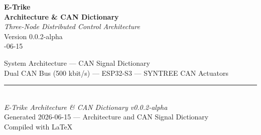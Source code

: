 \documentclass[12pt,a4paper,oneside]{report}
\begin{document}

\thispagestyle{empty}

\vspace*{60mm}

\begin{center}
  {\fontsize{28}{34}\selectfont\textbf{E-Trike}}\\[8mm]
  {\fontsize{22}{28}\selectfont\textbf{Architecture \& CAN Dictionary}}\\[20mm]
  {\fontsize{14}{18}\selectfont\textit{Three-Node Distributed Control Architecture}}\\[30mm]
  {\fontsize{12}{15}\selectfont Version 0.0.2-alpha}\\[4mm]
  {\fontsize{11}{14}-06-15}
\end{center}

\vfill

\begin{center}
  {\footnotesize
  System Architecture --- CAN Signal Dictionary\\[2mm]
  Dual CAN Bus (500 kbit/s) --- ESP32-S3 --- SYNTREE CAN Actuators
  }
\end{center}

\newpage


\setcounter{tocdepth}{1}
\tableofcontents
\newpage




\vfill

\begin{center}
  \rule{0.5\textwidth}{0.4pt}\\[4mm]
  {\small\textit{E-Trike Architecture \& CAN Dictionary v0.0.2-alpha}}\\[2mm]
  {\small Generated 2026-06-15 --- Architecture and CAN Signal Dictionary}\\[2mm]
  {\small Compiled with \LaTeX}
\end{center}
\end{document}

